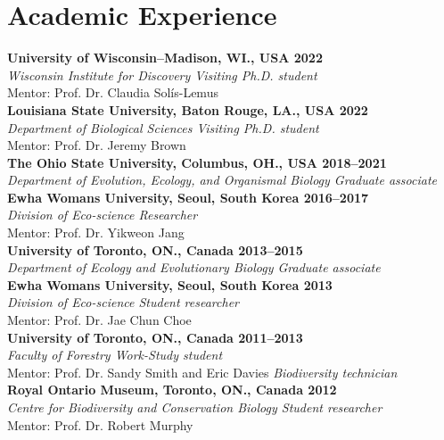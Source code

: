 \documentclass[11pt,letterpaper,sans]{moderncv} %
\begin{document}
\pagebreak
\section{Academic Experience}
\textbf{University of Wisconsin--Madison, WI., USA  \hfill{2022}}\\ 
\textit{Wisconsin Institute for Discovery \hfill {Visiting Ph.D. student}}\\
Mentor: Prof. Dr. Claudia Solís-Lemus\\

\textbf{Louisiana State University, Baton Rouge, LA., USA \hfill{2022}}\\
\textit{Department of Biological Sciences  \hfill Visiting Ph.D. student}\\
Mentor: Prof. Dr. Jeremy Brown\\

\textbf{The Ohio State University, Columbus, OH., USA \hfill 2018--2021}\\
\textit{Department of Evolution, Ecology, and Organismal Biology \hfill Graduate associate}\\

\textbf{Ewha Womans University, Seoul, South Korea \hfill{2016--2017}}\\
\textit{Division of Eco-science \hfill Researcher}\\
Mentor: Prof. Dr. Yikweon Jang\\

\textbf{University of Toronto, ON., Canada \hfill{2013--2015}}\\
\textit{Department of Ecology and Evolutionary Biology  \hfill Graduate associate}\\

\textbf{Ewha Womans University, Seoul, South Korea \hfill{2013}}\\
\textit{Division of Eco-science \hfill Student researcher}\\
Mentor: Prof. Dr. Jae Chun Choe\\

\textbf{University of Toronto, ON., Canada \hfill{2011--2013}}\\
\textit{Faculty of Forestry \hfill Work-Study student}\\
Mentor: Prof. Dr. Sandy Smith and Eric Davies \textit{\hfill Biodiversity technician}\\

\textbf{Royal Ontario Museum, Toronto, ON., Canada \hfill{2012}}\\
\textit{Centre for Biodiversity and Conservation Biology \hfill Student researcher}\\
Mentor: Prof. Dr. Robert Murphy\\
\end{document}
